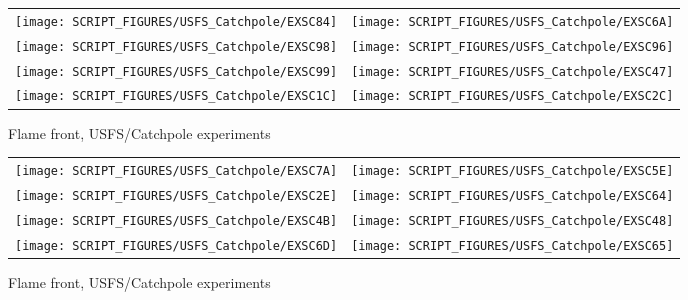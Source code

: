 \begin{figure}[p]
\begin{tabular*}{\textwidth}{l@{\extracolsep{\fill}}r}
\texttt{[image: SCRIPT\_FIGURES/USFS\_Catchpole/EXSC84]} &
\texttt{[image: SCRIPT\_FIGURES/USFS\_Catchpole/EXSC6A]} \\
\texttt{[image: SCRIPT\_FIGURES/USFS\_Catchpole/EXSC98]} &
\texttt{[image: SCRIPT\_FIGURES/USFS\_Catchpole/EXSC96]} \\
\texttt{[image: SCRIPT\_FIGURES/USFS\_Catchpole/EXSC99]} &
\texttt{[image: SCRIPT\_FIGURES/USFS\_Catchpole/EXSC47]} \\
\texttt{[image: SCRIPT\_FIGURES/USFS\_Catchpole/EXSC1C]} &
\texttt{[image: SCRIPT\_FIGURES/USFS\_Catchpole/EXSC2C]} \\
\end{tabular*}
\caption[Flame front, USFS/Catchpole experiments]{Flame front, USFS/Catchpole experiments}
\label{USFS_Catchpole_040}
\end{figure}

\begin{figure}[p]
\begin{tabular*}{\textwidth}{l@{\extracolsep{\fill}}r}
\texttt{[image: SCRIPT\_FIGURES/USFS\_Catchpole/EXSC7A]} &
\texttt{[image: SCRIPT\_FIGURES/USFS\_Catchpole/EXSC5E]} \\
\texttt{[image: SCRIPT\_FIGURES/USFS\_Catchpole/EXSC2E]} &
\texttt{[image: SCRIPT\_FIGURES/USFS\_Catchpole/EXSC64]} \\
\texttt{[image: SCRIPT\_FIGURES/USFS\_Catchpole/EXSC4B]} &
\texttt{[image: SCRIPT\_FIGURES/USFS\_Catchpole/EXSC48]} \\
\texttt{[image: SCRIPT\_FIGURES/USFS\_Catchpole/EXSC6D]} &
\texttt{[image: SCRIPT\_FIGURES/USFS\_Catchpole/EXSC65]} \\
\end{tabular*}
\caption[Flame front, USFS/Catchpole experiments]{Flame front, USFS/Catchpole experiments}
\label{USFS_Catchpole_048}
\end{figure}

